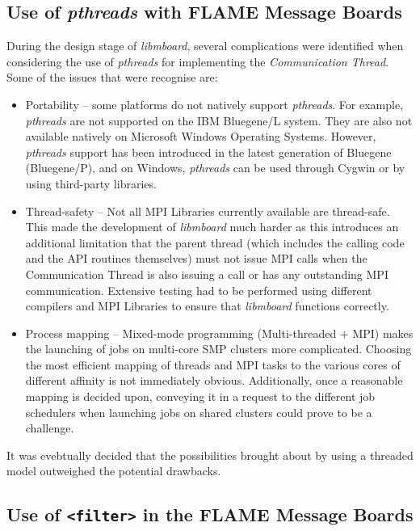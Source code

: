 \subsection{Use of \textit{pthreads} with FLAME Message Boards}

During the design stage of \textit{libmboard}, several complications were identified when considering the use of  \textit{pthreads} for implementing the \textit{Communication Thread}.  Some of the issues that were recognise are:
\begin{itemize}
\item Portability -- some platforms do not natively support \textit{pthreads}. For example, \textit{pthreads} are not supported on the IBM Bluegene/L system. They are also not available natively on Microsoft Windows Operating Systems. However, \textit{pthreads} support has been introduced in the latest generation of Bluegene (Bluegene/P), and on Windows, \textit{pthreads} can be used through Cygwin or by using third-party libraries.
\item Thread-safety -- Not all MPI Libraries currently available are thread-safe. This made the development of \textit{libmboard} much harder as this introduces an additional limitation that the parent thread (which includes the calling code and the API routines themselves) must not issue MPI calls when the Communication Thread is also issuing a call or has any outstanding MPI communication. Extensive testing had to be performed using different compilers and MPI Libraries to ensure that \textit{libmboard} functions correctly.
\item Process mapping -- Mixed-mode programming (Multi-threaded + MPI) makes the launching of jobs on multi-core SMP clusters more complicated. Choosing the most efficient mapping of threads and MPI tasks to the various cores of different affinity is not immediately obvious. Additionally, once a reasonable mapping is decided upon, conveying it in a request to the different job schedulers when launching jobs on shared clusters could prove to be a challenge.
\end{itemize} 
It was evebtually decided that the possibilities brought about by using a threaded model outweighed the potential drawbacks.


\subsection{Use of \texttt{<filter>} in the FLAME Message Boards}

